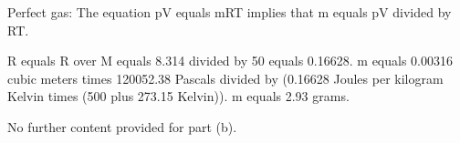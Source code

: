 Perfect gas: The equation pV equals mRT implies that m equals pV divided by RT.

R equals R over M equals 8.314 divided by 50 equals 0.16628.
m equals 0.00316 cubic meters times 120052.38 Pascals divided by (0.16628 Joules per kilogram Kelvin times (500 plus 273.15 Kelvin)).
m equals 2.93 grams.

No further content provided for part (b).